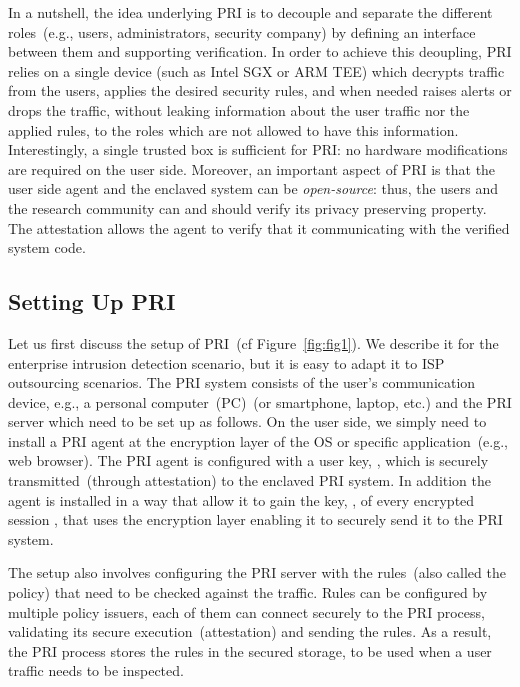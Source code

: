\documentclass{sig-alternate-10pt}
\newcommand{\sys}{PRI\xspace}
\begin{document}
In a nutshell, 
the idea underlying \sys is to decouple
and separate the different roles~(e.g., users, administrators, security company) 
by defining an interface between them and supporting verification.
In order to achieve this deoupling, \sys relies on a single device
(such as Intel SGX or ARM TEE)
which decrypts traffic 
from the users, applies the desired security rules, and when needed 
raises alerts or drops the traffic, without leaking information about the user 
traffic nor the applied rules, to the roles which are not allowed to have this information. 
 Interestingly, a single
trusted box is sufficient for \sys: no hardware modifications are required
on the user side.
Moreover, an important aspect of \sys
is that 
the user side agent and the enclaved system can be 
\emph{open-source}:
thus, the users and the research community can and should verify its privacy preserving property. 
The attestation allows the agent to verify that it  
communicating with the verified system code.

\subsection{Setting Up \sys}

Let us first discuss the setup of \sys~(cf Figure~\ref{fig:fig1}). 
We describe it for the enterprise intrusion detection scenario, but it is easy to adapt 
it to ISP outsourcing scenarios. 
The \sys system consists of the user's communication device, e.g., a personal computer~(PC)~(or smartphone, laptop, etc.) and the \sys server which need to be set up as follows. 
On the user side, we simply need to install 
a \sys agent at the encryption layer of the OS or specific application~(e.g., web browser). The \sys agent is configured with a user key, , which is securely transmitted~(through attestation) to the enclaved \sys system.
In addition the agent is installed in a way that allow it to gain the key, , of every encrypted session , that uses the encryption layer enabling it to securely send it to the \sys system.

The setup also involves configuring the \sys server with the rules~(also called the policy) 
that need to be checked against the traffic. Rules can be configured by 
multiple policy issuers, each of them can connect securely to the \sys process, 
validating its secure execution~(attestation) and sending the rules. 
As a result, the \sys process stores the rules in the secured storage, 
to be used when a user traffic needs to be inspected.
\end{document}
